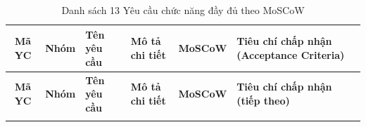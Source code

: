 \documentclass[12pt,a4paper]{article}
\begin{document}
\vspace{0.2cm}
\noindent
\footnotesize
\renewcommand{\arraystretch}{1.25}
\begin{xltabular}{\textwidth}{|c|>{\raggedright\arraybackslash}p{1.8cm}|>{\raggedright\arraybackslash}p{2.6cm}|>{\raggedright\arraybackslash}p{3cm}|c|>{\raggedright\arraybackslash}X|}
\caption{Danh sách 13 Yêu cầu chức năng đầy đủ theo MoSCoW} \label{tab:fr} \\
\hline
{}
\textbf{Mã YC} & \textbf{Nhóm} & \textbf{Tên yêu cầu} & \textbf{Mô tả chi tiết} & \textbf{MoSCoW} & \textbf{Tiêu chí chấp nhận (Acceptance Criteria)} \\
\hline
\endfirsthead

\hline
{}
\textbf{Mã YC} & \textbf{Nhóm} & \textbf{Tên yêu cầu} & \textbf{Mô tả chi tiết} & \textbf{MoSCoW} & \textbf{Tiêu chí chấp nhận (tiếp theo)} \\
\hline
\endhead

\hline
\endfoot

\hline
\endlastfoot


\end{xltabular}
\end{document}
